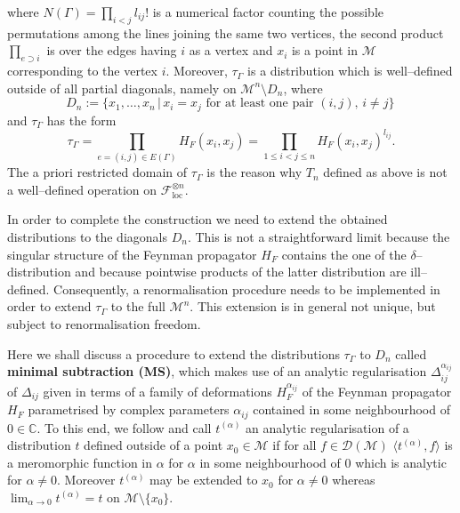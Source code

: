 \documentclass[a4paper,10pt,twoside]{article}
\numberwithin{equation}{section}
\newcounter{and}
\def\bbC{\mathbb{C}}
\def\M{\mathcal{M}}
\def\D{\mathcal{D}}
\def\loc{\mathrm{loc}}
\def\beq{\begin{equation}}
\def\eeq{\end{equation}}
\theoremstyle{plain}
\theoremstyle{definition}
\begin{document}
 where $N(\Gamma)= \prod_{i<j} l_{ij}! $ is a numerical factor counting the possible permutations among the lines joining the same two vertices, the second product $\prod_{e \supset i} $ is over the edges having $i$ as a vertex and $x_{i}$ is a point in $\M$ corresponding to the vertex $i$.
Moreover, $\tau_\Gamma$  is a distribution which is well--defined outside of all partial diagonals, namely on
$\M^n\setminus D_n$, where 
%
\beq\label{def:alldiagonals}
D_n:=\{x_1,\ldots,x_n\,|\, x_i=x_j \text{ for at least one pair } (i,j),\, i\neq j \}\,
\eeq
%
and $\tau_\Gamma$ has the form
%
\begin{equation}\label{eq:tgamma}
\tau_\Gamma = \prod_{e=(i,j)\in E(\Gamma)} H_F(x_{i},x_{j})=\prod_{1\le i<j\le n} H_F(x_{i},x_{j})^{l_{ij}}.
\end{equation}
%
The a priori restricted domain of $\tau_\Gamma$ is the reason why $T_n$ defined as above is not a well--defined operation on $\mathcal{F}_\loc^{\otimes n}$.

In order to complete the construction we need to extend the obtained distributions to the diagonals $D_n$. This is not a straightforward limit because the singular structure of the Feynman propagator $H_F$ contains the one of the $\delta$--distribution and because pointwise products of the latter distribution are ill--defined. Consequently, a renormalisation procedure needs to be implemented in order to extend $\tau_\Gamma$ to the full $\M^n$. This extension is in general not unique, but subject to renormalisation freedom.

Here we shall discuss a procedure to extend the distributions $\tau_\Gamma$ to $D_n$ called {\bf minimal subtraction (MS)}, which makes use of an analytic regularisation $\Delta^{\alpha_{ij}}_{ij}$ of $\Delta_{ij}$ given in terms of a family of deformations $H_F^{\alpha_{ij}}$ of the Feynman propagator $H_F$ parametrised by complex parameters $\alpha_{ij}$ contained in some neighbourhood of $0\in\bbC$. To this end, we follow \cite{dfkr} and call $t^{(\alpha)}$ an analytic regularisation of a distribution $t$ defined outside of a point $x_0\in\M$ if for all $f\in\D(\M)$ $\langle t^{(\alpha)}, f\rangle$ is a meromorphic function in $\alpha$ for $\alpha$ in some neighbourhood of $0$ which is analytic for $\alpha\neq 0$. Moreover $t^{(\alpha)}$ may be extended to $x_0$ for $\alpha\neq 0$ whereas $\lim_{\alpha\to 0}t^{(\alpha)}=t$ on $\M\setminus\{x_0\}$.
\end{document}
